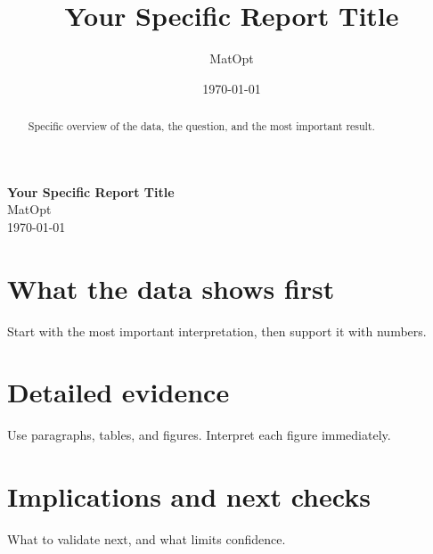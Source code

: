 \documentclass[11pt,a4paper]{article}
\title{Your Specific Report Title}
\author{MatOpt}
\date{\today}
\begin{document}
\thispagestyle{firstpage}

\begin{center}
  \vspace*{3cm}
  {\LARGE \textbf{Your Specific Report Title}} \\[0.5em]
  {\large MatOpt} \\[0.5em]
  {\large \today}
\end{center}

\begin{abstract}
Specific overview of the data, the question, and the most important result.
\end{abstract}

\newpage

\section{What the data shows first}
Start with the most important interpretation, then support it with numbers.

\section{Detailed evidence}
Use paragraphs, tables, and figures. Interpret each figure immediately.

\section{Implications and next checks}
What to validate next, and what limits confidence.
\end{document}
